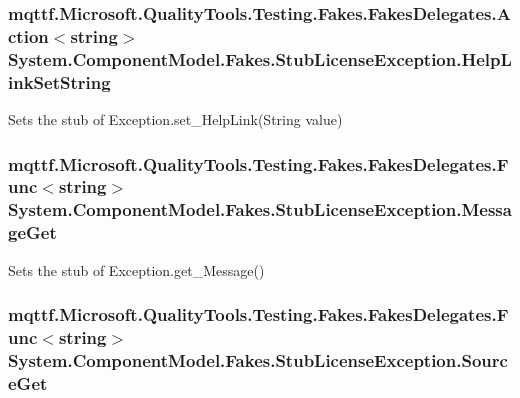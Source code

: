 \hypertarget{class_system_1_1_component_model_1_1_fakes_1_1_stub_license_exception_ac34f284d5514c01b777b366deb212458}{
\subsubsection[{Help\-Link\-Set\-String}]{\setlength{\rightskip}{0pt plus 5cm}mqttf.\-Microsoft.\-Quality\-Tools.\-Testing.\-Fakes.\-Fakes\-Delegates.\-Action$<$string$>$ System.\-Component\-Model.\-Fakes.\-Stub\-License\-Exception.\-Help\-Link\-Set\-String}}\label{class_system_1_1_component_model_1_1_fakes_1_1_stub_license_exception_ac34f284d5514c01b777b366deb212458}


Sets the stub of Exception.\-set\-\_\-\-Help\-Link(\-String value)

\hypertarget{class_system_1_1_component_model_1_1_fakes_1_1_stub_license_exception_a83f9e3c0ccb5ad2d16b2f057df879998}{
\subsubsection[{Message\-Get}]{\setlength{\rightskip}{0pt plus 5cm}mqttf.\-Microsoft.\-Quality\-Tools.\-Testing.\-Fakes.\-Fakes\-Delegates.\-Func$<$string$>$ System.\-Component\-Model.\-Fakes.\-Stub\-License\-Exception.\-Message\-Get}}\label{class_system_1_1_component_model_1_1_fakes_1_1_stub_license_exception_a83f9e3c0ccb5ad2d16b2f057df879998}


Sets the stub of Exception.\-get\-\_\-\-Message()

\hypertarget{class_system_1_1_component_model_1_1_fakes_1_1_stub_license_exception_a483ab1692b8a7892f8d35dbf946f9f8c}{
\subsubsection[{Source\-Get}]{\setlength{\rightskip}{0pt plus 5cm}mqttf.\-Microsoft.\-Quality\-Tools.\-Testing.\-Fakes.\-Fakes\-Delegates.\-Func$<$string$>$ System.\-Component\-Model.\-Fakes.\-Stub\-License\-Exception.\-Source\-Get}}\label{class_system_1_1_component_model_1_1_fakes_1_1_stub_license_exception_a483ab1692b8a7892f8d35dbf946f9f8c}


